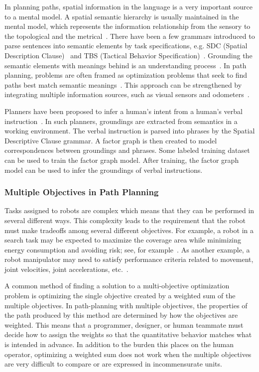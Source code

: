 \documentclass[phd]{byuprop}
\begin{document}
In planning paths, spatial information in the language is a very important source to a mental model.
A spatial semantic hierarchy is usually maintained in the mental model, which represents the information relationship from the sensory to the topological and the metrical~\cite{kuipers1999}.
There have been a few grammars introduced to parse sentences into semantic elements by task specifications, e.g. SDC (Spatial Description Clause)~\cite{tellex2011understanding} and TBS (Tactical Behavior Specification)~\cite{Boularias_2015_7953}.
Grounding the semantic elements with meanings behind is an understanding process~\cite{Kollar:2010:TUN:1734454.1734553}.
In path planning, problems are often framed as optimization problems that seek to find paths best match semantic meanings~\cite{tellex2011understanding,Boularias_2015_7953}.
This approach can be strengthened by integrating multiple information sources, such as visual sensors and odometers~\cite{6696569}.

Planners have been proposed to infer a human's intent from a human's verbal instruction~\cite{howard2014natural,Duvallet2014}.
In such planners, groundings are extracted from semantics in a working environment.
The verbal instruction is parsed into phrases by the Spatial Descriptive Clause grammar. 
A factor graph is then created to model correspondences between groundings and phrases.
Some labeled training dataset can be used to train the factor graph model.
After training, the factor graph model can be used to infer the groundings of verbal instructions.

\subsubsection{Multiple Objectives in Path Planning}
\label{sec:related_work:algorithm_specific_work:multiple_objectives_in_path_planning}

Tasks assigned to robots are complex which means that they can be performed in several different ways.
This complexity leads to the requirement that the robot must make tradeoffs among several different objectives.
For example, a robot in a search task may be expected to maximize the coverage area while minimizing energy consumption and avoiding risk; see, for example~\cite{Mei2005,Yi2014}. 
As another example, a robot manipulator may need to satisfy performance criteria related to movement, joint velocities, joint accelerations, etc.~\cite{Pires2004}.

A common method of finding a solution to a multi-objective optimization problem is optimizing the single objective created by a weighted sum of the multiple objectives.  
In path-planning with multiple objectives, the properties of the path produced by this method are determined by how the objectives are weighted. 
This means that a programmer, designer, or human teammate must decide how to assign the weights so that the quantitative behavior matches what is intended in advance.  
In addition to the burden this places on the human operator, optimizing a weighted sum does not work when the multiple objectives are very difficult to compare or are expressed in incommensurate units.
\end{document}
